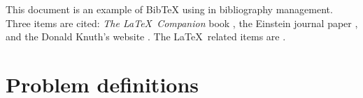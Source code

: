 \documentclass[a4paper, 10pt, twoside, openright]{book}
\begin{document}
This document is an example of BibTeX using in bibliography management. Three items are cited: \textit{The \LaTeX\ Companion} book \cite{latexcompanion}, the Einstein journal paper \cite{einstein}, and the Donald Knuth's website \cite{knuthwebsite}. The \LaTeX\ related items are \cite{latexcompanion,knuthwebsite}.





%







\appendix
\chapter{Problem definitions} \label{definitions}
\end{document}
